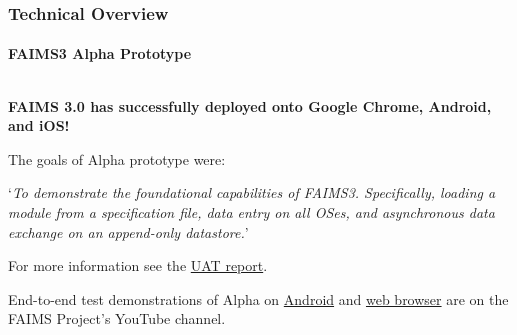 \documentclass[
	aspectratio=169, %
	11pt, %
	t, %
]{beamer}
\begin{document}




\begin{frame}
\frametitle{Technical Overview}
\framesubtitle{FAIMS3 Alpha Prototype}
\vspace{-.75cm}
\begin{columns}
\begin{column}{0.5\textwidth}

\medskip 

\textbf{FAIMS 3.0 has successfully deployed onto Google Chrome, Android, and iOS! } \medskip 

The goals of Alpha prototype were: \smallskip

`\textit{To demonstrate the foundational capabilities of FAIMS3. Specifically, loading a module from a specification file, data entry on all OSes, and asynchronous data exchange on an append-only datastore.}' \medskip 

For more information see the \href{https://doi.org/10.5281/zenodo.5030772}{UAT report}. \smallskip 

End-to-end test demonstrations of Alpha on \href{https://youtu.be/79_sIVg8zDM}{Android} and \href{https://youtu.be/O4btmhKLyc4}{web browser} are on the FAIMS Project's YouTube channel.  


\end{column}
\end{columns}
\end{frame}
\end{document}
